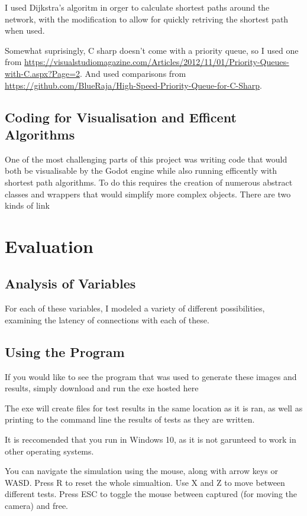 \documentclass[12pt]{article}
\begin{document}
I used Dijkstra's algoritm in orger to calculate shortest paths around the network, with the modification to allow for quickly retriving the shortest path when used.

Somewhat suprisingly, C sharp doesn't come with a priority queue, so I used one from \url{https://visualstudiomagazine.com/Articles/2012/11/01/Priority-Queues-with-C.aspx?Page=2}. And used comparisons from \url{https://github.com/BlueRaja/High-Speed-Priority-Queue-for-C-Sharp}.

\subsection{Coding for Visualisation and Efficent Algorithms}

One of the most challenging parts of this project was writing code that would both be visualisable by the Godot engine while also running efficently with shortest path algorithms. To do this requires the creation of numerous abstract classes and wrappers that would simplify more complex objects. There are two kinds of link

\section{Evaluation}

\subsection{Analysis of Variables}
For each of these variables, I modeled a variety of different possibilities, examining the latency of connections with each of these.


\subsection{Using the Program}

If you would like to see the program that was used to generate these images and results, simply download and run the exe hosted here %

The exe will create files for test results in the same location as it is ran, as well as printing to the command line the results of tests as they are written.

It is reccomended that you run in Windows 10, as it is not garunteed to work in other operating systems.

You can navigate the simulation using the mouse, along with arrow keys or WASD. Press R to reset the whole simualtion. Use X and Z to move between different tests. Press ESC to toggle the mouse between captured (for moving the camera) and free.
\end{document}
